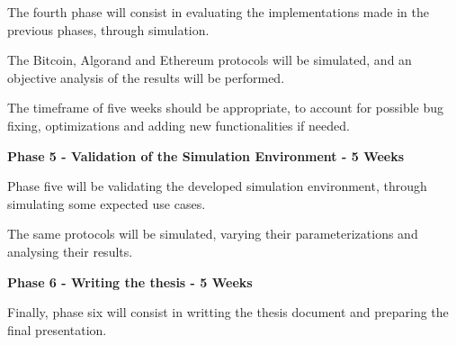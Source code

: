 The fourth phase will consist in evaluating the implementations made in the previous phases, through simulation.

The Bitcoin, Algorand and Ethereum protocols will be simulated, and an objective analysis of the results will be performed.

The timeframe of five weeks should be appropriate, to account for possible bug fixing, optimizations and adding new functionalities if needed.

\vspace{0.25cm}

\textbf{Phase 5 - Validation of the Simulation Environment - 5 Weeks}

Phase five will be validating the developed simulation environment, through simulating some expected use cases.

The same protocols will be simulated, varying their parameterizations and analysing their results.

\vspace{0.25cm}

\textbf{Phase 6 - Writing the thesis - 5 Weeks}

Finally, phase six will consist in writting the thesis document and preparing the final presentation.


